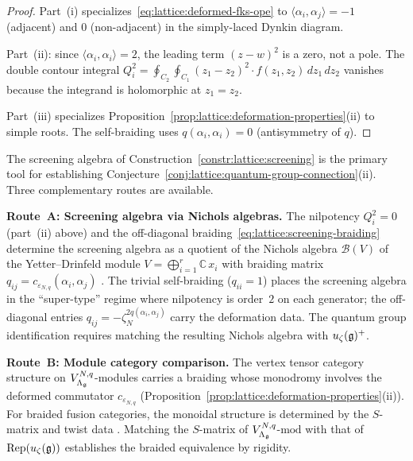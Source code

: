\begin{proof}
Part~(i) specializes~\eqref{eq:lattice:deformed-fks-ope} to
$\langle\alpha_i,\alpha_j\rangle = -1$ (adjacent) and $0$
(non-adjacent) in the simply-laced Dynkin diagram.

Part~(ii): since $\langle\alpha_i,\alpha_i\rangle = 2$, the
leading term $(z-w)^2$ is a zero, not a pole.  The double
contour integral
$Q_i^2 = \oint_{C_2}\oint_{C_1}
  (z_1-z_2)^2 \cdot f(z_1,z_2)\,dz_1\,dz_2$
vanishes because the integrand is holomorphic at $z_1 = z_2$.

Part~(iii) specializes
Proposition~\ref{prop:lattice:deformation-properties}(ii) to
simple roots.  The self-braiding uses $q(\alpha_i,\alpha_i) = 0$
(antisymmetry of $q$).
\end{proof}

\begin{remark}
\label{rem:lattice:qg-programme}
The screening algebra of
Construction~\ref{constr:lattice:screening} is the primary
tool for establishing
Conjecture~\ref{conj:lattice:quantum-group-connection}(ii).
Three complementary routes are available.

\smallskip
\noindent\textbf{Route~A\textup{:} Screening algebra via Nichols
algebras.}
The nilpotency $Q_i^2 = 0$ (part~(ii) above) and the
off-diagonal braiding~\eqref{eq:lattice:screening-braiding}
determine the screening algebra as a quotient of the Nichols
algebra $\mathcal{B}(V)$ of the Yetter--Drinfeld module
$V = \bigoplus_{i=1}^r \mathbb{C}\, x_i$ with braiding matrix
$q_{ij} = c_{\varepsilon_{N,q}}(\alpha_i,\alpha_j)$
\cite{Lentner17}.
The trivial self-braiding ($q_{ii} = 1$) places the screening
algebra in the ``super-type'' regime where nilpotency is
order~$2$ on each generator; the off-diagonal entries
$q_{ij} = -\zeta_N^{2q(\alpha_i,\alpha_j)}$ carry the
deformation data.  The quantum group identification requires
matching the resulting Nichols algebra with $u_\zeta(\mathfrak{g})^+$.

\smallskip
\noindent\textbf{Route~B\textup{:} Module category comparison.}
The vertex tensor category structure on
$V_{\Lambda_{\mathfrak{g}}}^{N,q}$-modules \cite{HLZ} carries a
braiding whose monodromy involves the deformed commutator
$c_{\varepsilon_{N,q}}$
(Proposition~\ref{prop:lattice:deformation-properties}(ii)).
For braided fusion categories, the monoidal structure is
determined by the $S$-matrix and twist data \cite{EGNO}.
Matching the $S$-matrix of
$V_{\Lambda_{\mathfrak{g}}}^{N,q}$-$\mathrm{mod}$ with that of
$\operatorname{Rep}(u_\zeta(\mathfrak{g}))$ establishes the braided
equivalence by rigidity.


\end{remark}
